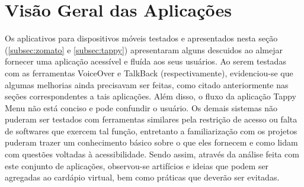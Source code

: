 \section{Visão Geral das Aplicações}

Os aplicativos para dispositivos móveis testados e apresentados nesta seção (\ref{subsec:zomato} e \ref{subsec:tappy}) apresentaram alguns descuidos ao almejar fornecer uma aplicação acessível e fluída aos seus usuários. Ao serem testadas com as ferramentas VoiceOver e TalkBack (respectivamente), evidenciou-se que algumas melhorias ainda precisavam ser feitas, como citado anteriormente nas seções correspondentes a tais aplicações. Além disso, o fluxo da aplicação Tappy Menu não está conciso e pode confundir o usuário. Os demais sistemas não puderam ser testados com ferramentas similares pela restrição de acesso ou falta de softwares que exercem tal função, entretanto a familiarização com os projetos puderam trazer um conhecimento básico sobre o que eles fornecem e como lidam com questões voltadas à acessibilidade. Sendo assim, através da análise feita com este conjunto de aplicações, observou-se artifícios e ideias que podem ser agregadas ao cardápio virtual, bem como práticas que deverão ser evitadas.